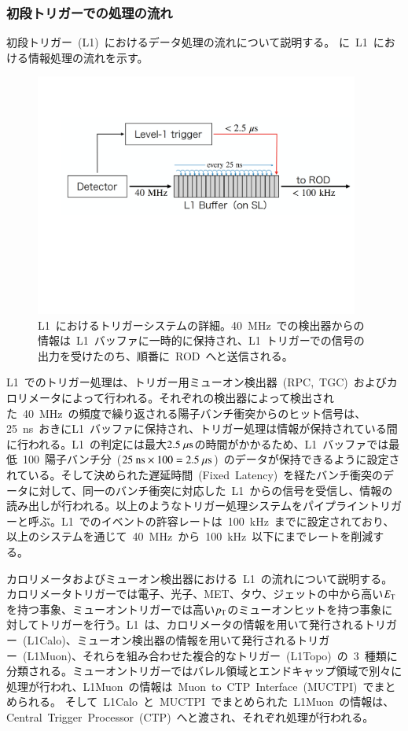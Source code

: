\subsubsection{初段トリガーでの処理の流れ}
初段トリガー~(L1)~におけるデータ処理の流れについて説明する。
に~L1~における情報処理の流れを示す。
\begin{figure}[H]
        \centering   
        \includegraphics[width=0.95\textwidth,page=1]{img/pdf/pipe.pdf}
        \caption[L1~におけるトリガーシステムの詳細]{L1~におけるトリガーシステムの詳細。40~MHz~での検出器からの情報は~L1~バッファに一時的に保持され、L1~トリガーでの信号の出力を受けたのち、順番に~ROD~へと送信される。}\label{fig:pipe}
\end{figure}
L1~でのトリガー処理は、トリガー用ミューオン検出器~(RPC,~TGC)~およびカロリメータによって行われる。それぞれの検出器によって検出された~40~MHz~の頻度で繰り返される陽子バンチ衝突からのヒット信号は、25~ns~おきにL1~バッファに保持され、トリガー処理は情報が保持されている間に行われる。L1~の判定には最大$2.5~\mu\rm{s}$の時間がかかるため、L1~バッファでは最低~100~陽子バンチ分~($25~\rm{ns}\times100=2.5~\mu\rm{s}$)~のデータが保持できるように設定されている。そして決められた遅延時間~(Fixed~Latency)~を経たバンチ衝突のデータに対して、同一のバンチ衝突に対応した~L1~からの信号を受信し、情報の読み出しが行われる。以上のようなトリガー処理システムをパイプライントリガーと呼ぶ。L1~でのイベントの許容レートは~100~kHz~までに設定されており、以上のシステムを通じて~40~MHz~から~100~kHz~以下にまでレートを削減する。

カロリメータおよびミューオン検出器における~L1~の流れについて説明する。カロリメータトリガーでは電子、光子、MET、タウ、ジェットの中から高い$E_{\rm{T}}$を持つ事象、ミューオントリガーでは高い$p_{\rm{T}}$のミューオンヒットを持つ事象に対してトリガーを行う。L1~は、カロリメータの情報を用いて発行されるトリガー~(L1Calo)、ミューオン検出器の情報を用いて発行されるトリガー~(L1Muon)、それらを組み合わせた複合的なトリガー~(L1Topo)~の~3~種類に分類される。ミューオントリガーではバレル領域とエンドキャップ領域で別々に処理が行われ、L1Muon~の情報は~Muon~to~CTP~Interface~(MUCTPI)~でまとめられる。
そして~L1Calo~と~MUCTPI~でまとめられた~L1Muon~の情報は、Central~Trigger~Processor~(CTP)~へと渡され、それぞれ処理が行われる。

